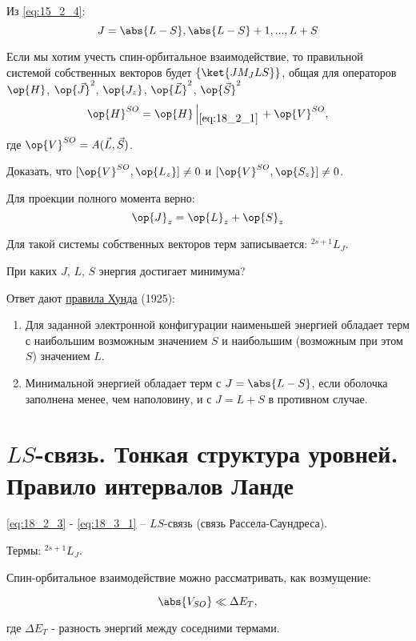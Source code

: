 Из \eqref{eq:15_2_4}:
$$
J = \abs{L-S}, \abs{L-S} + 1, ..., L+S
$$

Если мы хотим учесть спин-орбитальное взаимодействие, то правильной системой собственных векторов будет $\{ \ket{J M_J L S}\}$, общая для операторов $\op{H}$, $\op{\vec{J}}^2$, $\op{J_z}$, $\op{\vec{L}}^2$, $\op{\vec{S}}^2$
\begin{gather*}
\op{H}^{SO} = \op{H} \left |_{\eqref{eq:18_2_1}} \right . + \op{V}^{SO},
\end{gather*}

где $\op{V}^{SO} = A(\vec{L}, \vec{S})$.

\begin{excr}
Доказать, что $[\op{V}^{SO}, \op{L_z}] \not = 0$ и $[\op{V}^{SO}, \op{S_z}] \not = 0$.
\end{excr}

Для проекции полного момента верно:
$$
\op{J}_z = \op{L}_z + \op{S}_z
$$

Для такой системы собственных векторов терм записывается: $\boxed{^{2s+1}L_J}$. 

При каких $J$, $L$, $S$ энергия достигает минимума?

Ответ дают \underline{правила Хунда} (1925):

\begin{enumerate}
\item Для заданной электронной конфигурации наименьшей энергией обладает терм с наибольшим возможным значением $S$ и наибольшим (возможным при этом $S$) значением $L$.
\item Минимальной энергией обладает терм с $J = \abs{L-S}$, если оболочка заполнена менее, чем наполовину, и с $J = L + S$ в противном случае.
\end{enumerate}

\section{$LS$-связь. Тонкая структура уровней. Правило интервалов Ланде}

\eqref{eq:18_2_3} - \eqref{eq:18_3_1} -- $LS$-связь (связь Рассела-Саундреса).

Термы: $^{2s+1}L_J$.

Спин-орбитальное взаимодействие можно рассматривать, как возмущение:

\begin{equation}
\label{eq:18_4_1}
\abs{V_{SO}} \ll \Delta E_T,
\end{equation}

 где $\Delta E_T$ - разность энергий между соседними термами.
 
